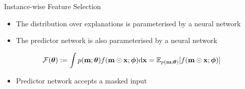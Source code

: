\documentclass[11pt,compress,t,notes=noshow, aspectratio=169, xcolor=table]{beamer}
\begin{document}
	
\begin{frame}{Instance-wise Feature Selection}
\begin{itemize}
    \item The distribution over explanations is parameterised by a neural network
    \item The predictor network is also parameterised by a neural network
\end{itemize}
\bigskip
\begin{equation*}
             \centering
    \mathcal{F}(\boldsymbol{\theta}):=\int p(\mathbf{m} ; \boldsymbol{\theta}) f(\mathbf{m} \odot \mathbf{x} ; \boldsymbol{\phi}) \mathrm{d} \mathbf{x}=\mathbb{E}_{p(\mathbf{m} ; \boldsymbol{\theta})}[f(\mathbf{m} \odot \mathbf{x} ; \boldsymbol{\phi})]
\end{equation*}

\bigskip

\begin{itemize}
    \item Predictor network accepts a masked input
\end{itemize}
\end{frame}
\end{document}
